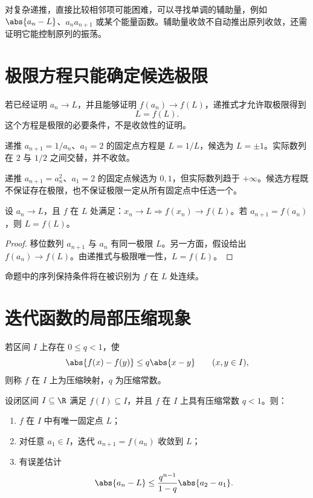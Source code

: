 对复杂递推，直接比较相邻项可能困难，可以寻找单调的辅助量，例如 \(\abs{a_n-L}\)、\(a_na_{n+1}\) 或某个能量函数。辅助量收敛不自动推出原列收敛，还需证明它能控制原列的振荡。

\section{极限方程只能确定候选极限}

若已经证明 \(a_n\to L\)，并且能够证明 \(f(a_n)\to f(L)\)，递推式才允许取极限得到
\[
 L=f(L).
\]
这个方程是极限的必要条件，不是收敛性的证明。

\begin{counterexample}
递推 \(a_{n+1}=1/a_n\)、\(a_1=2\) 的固定点方程是 \(L=1/L\)，候选为 \(L=\pm1\)。实际数列在 \(2\) 与 \(1/2\) 之间交替，并不收敛。
\end{counterexample}

\begin{counterexample}
递推 \(a_{n+1}=a_n^2\)、\(a_1=2\) 的固定点候选为 \(0,1\)，但实际数列趋于 \(+\infty\)。候选方程既不保证存在极限，也不保证极限一定从所有固定点中任选一个。
\end{counterexample}

\begin{proposition}
设 \(a_n\to L\)，且 \(f\) 在 \(L\) 处满足：\(x_n\to L\Rightarrow f(x_n)\to f(L)\)。若 \(a_{n+1}=f(a_n)\)，则 \(L=f(L)\)。
\end{proposition}

\begin{proof}
移位数列 \(a_{n+1}\) 与 \(a_n\) 有同一极限 \(L\)。另一方面，假设给出
\(f(a_n)\to f(L)\)。由递推式与极限唯一性，\(L=f(L)\)。
\end{proof}

命题中的序列保持条件将在被识别为 \(f\) 在 \(L\) 处连续。

\section{迭代函数的局部压缩现象}

\begin{definition}
若区间 \(I\) 上存在 \(0\le q<1\)，使
\[
 \abs{f(x)-f(y)}\le q\abs{x-y}\qquad(x,y\in I),
\]
则称 \(f\) 在 \(I\) 上为压缩映射，\(q\) 为压缩常数。
\end{definition}

\begin{theorem}[区间上的压缩迭代]
设闭区间 \(I\subseteq\R\) 满足 \(f(I)\subseteq I\)，并且 \(f\) 在 \(I\) 上具有压缩常数 \(q<1\)。则：
\begin{enumerate}
 \item \(f\) 在 \(I\) 中有唯一固定点 \(L\)；
 \item 对任意 \(a_1\in I\)，迭代 \(a_{n+1}=f(a_n)\) 收敛到 \(L\)；
 \item 有误差估计
 \[
  \abs{a_n-L}\le\frac{q^{n-1}}{1-q}\abs{a_2-a_1}.
 \]
\end{enumerate}
\end{theorem}

